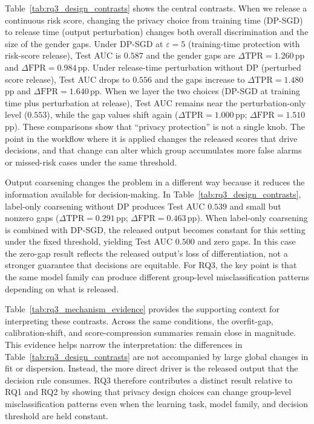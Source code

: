\documentclass{edm_article}
\begin{document}
Table~\ref{tab:rq3_design_contrasts} shows the central contrasts. When we release a continuous risk score, changing the privacy choice from training time (DP-SGD) to release time (output perturbation) changes both overall discrimination and the size of the gender gaps. Under DP-SGD at $\varepsilon{=}5$ (training-time protection with risk-score release), Test AUC is $0.587$ and the gender gaps are $\Delta\mathrm{TPR}=1.260$\,pp and $\Delta\mathrm{FPR}=0.984$\,pp. Under release-time perturbation without DP (perturbed score release), Test AUC drops to $0.556$ and the gaps increase to $\Delta\mathrm{TPR}=1.480$\,pp and $\Delta\mathrm{FPR}=1.640$\,pp. When we layer the two choices (DP-SGD at training time plus perturbation at release), Test AUC remains near the perturbation-only level ($0.553$), while the gap values shift again ($\Delta\mathrm{TPR}=1.000$\,pp; $\Delta\mathrm{FPR}=1.510$\,pp). These comparisons show that “privacy protection” is not a single knob. The point in the workflow where it is applied changes the released scores that drive decisions, and that change can alter which group accumulates more false alarms or missed-risk cases under the same threshold.

Output coarsening changes the problem in a different way because it reduces the information available for decision-making. In Table~\ref{tab:rq3_design_contrasts}, label-only coarsening without DP produces Test AUC $0.539$ and small but nonzero gaps ($\Delta\mathrm{TPR}=0.291$\,pp; $\Delta\mathrm{FPR}=0.463$\,pp). When label-only coarsening is combined with DP-SGD, the released output becomes constant for this setting under the fixed threshold, yielding Test AUC $0.500$ and zero gaps. In this case the zero-gap result reflects the released output’s loss of differentiation, not a stronger guarantee that decisions are equitable. For RQ3, the key point is that the same model family can produce different group-level misclassification patterns depending on what is released.

Table~\ref{tab:rq3_mechanism_evidence} provides the supporting context for interpreting these contrasts. Across the same conditions, the overfit-gap, calibration-shift, and score-compression summaries remain close in magnitude. This evidence helps narrow the interpretation: the differences in Table~\ref{tab:rq3_design_contrasts} are not accompanied by large global changes in fit or dispersion. Instead, the more direct driver is the released output that the decision rule consumes. RQ3 therefore contributes a distinct result relative to RQ1 and RQ2 by showing that privacy design choices can change group-level misclassification patterns even when the learning task, model family, and decision threshold are held constant.
\end{document}
